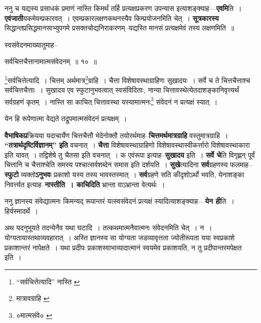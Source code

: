 \documentclass[article,12pt,a4paper]{memoir}
\begin{document}
	  \pstart ननु च यद्यस्य प्रसाधकं प्रमाणं नास्ति किमर्थं तर्हि प्रत्यक्षप्रकरण उपन्यास इत्याशङ्क्याह—\textbf{एवमि}ति । \textbf{एवंजाती}यकमेवम्प्रकारवत् । एवम्प्रकारलक्षणकथनस्यैव किम्प्रयोजनमिति चेत् । \textbf{सूत्रकारस्य} सिद्धान्तप्रसिद्धमानसाभ्युपगमे प्रसक्तचोद्यनिराकरणम्--यद्यस्ति मानसं प्रत्यक्षमेवं तस्य लक्षणमिति ॥
	\pend
	  \bigskip
	  \begingroup
	

	  \pstart स्वसंवेदनमाख्यातुमाह--
	\pend
       
	  \bigskip
	  \begingroup
	

	  \pstart सर्वचित्तचैत्तानामात्मसंवेदनम् ॥ १० ॥
	\pend
      
	  \endgroup
	 

	  \pstart \footnote{“सर्वचित्तेत्यादि” नास्ति \cite{dp-msA} \cite{dp-msC}}\-सर्वचित्तेत्यादि । चित्तम् अर्थमात्र\footnote{मात्रावग्राहि \cite{dp-msC}}\-ग्राहि । चैत्ता विशेषावस्थाग्राहिणः सुखादयः । सर्वे च ते चित्तचैत्ताश्च सर्वचित्तचैत्ताः । सुखादय एव स्फुटानुभवत्वात् स्वसंविदिताः, नान्या चित्तावस्थेत्येतदाशङ्कानिवृत्त्यर्थं सर्वग्रहणं कृतम् । नास्ति सा काचित् चित्तावस्था यस्यामात्मनः\footnote{०मात्मसंवे० \cite{dp-msD}} संवेदनं न प्रत्यक्षं स्यात् ।
	\pend
       

	  \pstart येन हि रूपेणात्मा वेद्यते तद्रूपमात्मसंवेदनं प्रत्यक्षम् ।
	\pend
      
	  \endgroup
	

	  \pstart \textbf{वैभाषिकप्र}क्रियया यदाचार्येण चित्तचैत्तौ भेदेनोक्तौ तयोरर्थमाह--\textbf{चित्तमर्थमात्रग्राहि} वस्तुमात्रग्राहि । \textbf{“तत्रार्थदृष्टिर्विज्ञानम्” इति} वचनात् । \textbf{चैत्ता} विशेषावस्थाग्राहिणो विशेषावस्थास्वीकर्त्तारो विशेषावस्थाकारा इति यावत् । तद्विशेषे तु चैतसा इति वचनात् । क एवंरूपा इत्याह--\textbf{सुखादय} इति । \textbf{सर्वे चे}ति विगृह्णन् पूर्वं चित्तानि च चैत्ताश्चेति समस्य पश्चात्सर्वशब्देन समास इति दर्शयति । \textbf{सुखे}त्यादिना \textbf{सर्व}ग्रहणस्य फलमाह--\textbf{स्फुटो} व्यक्तो\textbf{ऽनुभवः} प्रकाशो यस्य तस्य भावस्तस्मात् । \textbf{सर्व}ग्रहणे सति कीदृशोऽर्थो भवति, येनाशङ्का निवर्त्त्यत इत्याह--\textbf{नास्तीति । काचिदिति} भ्रान्ता वाऽभ्रान्ता वेत्यर्थः ।
	\pend
      

	  \pstart ननु ज्ञानस्य संवेद्यात्मनः किमन्यद् रूपान्तरं यत्स्वसंवेदनं प्रत्यक्षं स्यादित्याशङ्क्याह—\textbf{येन ही}ति । हिर्यस्मादर्थे ।
	\pend
      

	  \pstart अथ यदनुभूयते तदन्येनैव यथा घटादि । तत्कथमात्मनैवात्मनः संवेदनमिति चेत् । न । योग्यतायास्तथाव्यवहारात् । अस्ति ज्ञानस्य सा योग्यता जडव्यावृत्तता ज्योतीरूपता यया स्वप्रकाशे प्रकाशान्तरं नापेक्षते । यथा प्रदीपः प्रकाशस्वाभाव्यादात्मानं स्वयमेव प्रकाशयति, न तु प्रदीपान्तरमपेक्षत इति ।
	\pend
      
\end{document}

